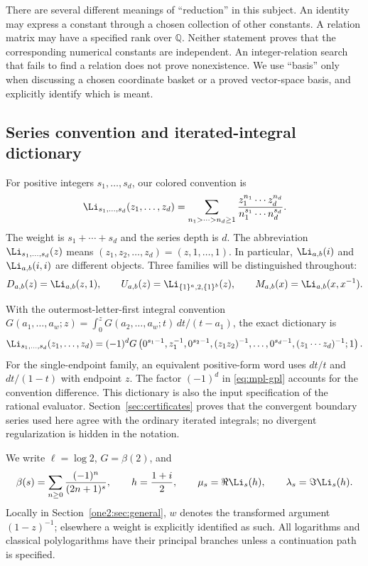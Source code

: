 There are several different meanings of ``reduction'' in this subject.
An identity may express a constant through a chosen collection of other
constants. A relation matrix may have a specified rank over $\mathbb Q$.
Neither statement proves that the corresponding numerical constants are
independent. An integer-relation search that fails to find a relation
does not prove nonexistence. We use ``basis'' only when discussing a
chosen coordinate basket or a proved vector-space basis, and explicitly
identify which is meant.

\subsection{Series convention and iterated-integral dictionary}

For positive integers $s_1,\ldots,s_d$, our colored convention is
\begin{equation}\label{eq:mpl-definition}
 \Li_{s_1,\ldots,s_d}(z_1,\ldots,z_d)
 =\sum_{n_1>\cdots>n_d\ge1}
 \frac{z_1^{n_1}\cdots z_d^{n_d}}
 {n_1^{s_1}\cdots n_d^{s_d}}.
\end{equation}
The weight is $s_1+\cdots+s_d$ and the series depth is $d$.
The abbreviation $\Li_{s_1,\ldots,s_d}(z)$ means
$(z_1,z_2,\ldots,z_d)=(z,1,\ldots,1)$. In particular,
$\Li_{a,b}(i)$ and $\Li_{a,b}(i,i)$ are different objects.
Three families will be distinguished throughout:
\[
 D_{a,b}(z)=\Li_{a,b}(z,1),\qquad
 U_{a,b}(z)=\Li_{\{1\}^a,2,\{1\}^b}(z),\qquad
 M_{a,b}(x)=\Li_{a,b}(x,x^{-1}).
\]

With the outermost-letter-first integral convention
$G(a_1,\ldots,a_w;z)=\int_0^zG(a_2,\ldots,a_w;t)\,dt/(t-a_1)$,
the exact dictionary is
\begin{equation}\label{eq:mpl-gpl}
 \Li_{s_1,\ldots,s_d}(z_1,\ldots,z_d)
 =(-1)^dG\left(0^{s_1-1},z_1^{-1},
 0^{s_2-1},(z_1z_2)^{-1},\ldots,
 0^{s_d-1},(z_1\cdots z_d)^{-1};1\right).
\end{equation}
For the single-endpoint family, an equivalent positive-form word uses
$dt/t$ and $dt/(1-t)$ with endpoint $z$. The factor $(-1)^d$ in
\eqref{eq:mpl-gpl} accounts for the convention difference. This
dictionary is also the input specification of the rational evaluator.
Section~\ref{sec:certificates} proves that the convergent boundary series
used here agree with the ordinary iterated integrals; no divergent
regularization is hidden in the notation.

We write $\ell=\log2$, $G=\beta(2)$, and
\[
 \beta(s)=\sum_{n\ge0}\frac{(-1)^n}{(2n+1)^s},\qquad
 h=\frac{1+i}{2},\qquad
 \mu_s=\Re\Li_s(h),\qquad\lambda_s=\Im\Li_s(h).
\]
Locally in Section~\ref{one2:sec:general}, $w$ denotes the transformed
argument $(1-z)^{-1}$; elsewhere a weight is explicitly identified as
such. All logarithms and classical polylogarithms have their principal
branches unless a continuation path is specified.

